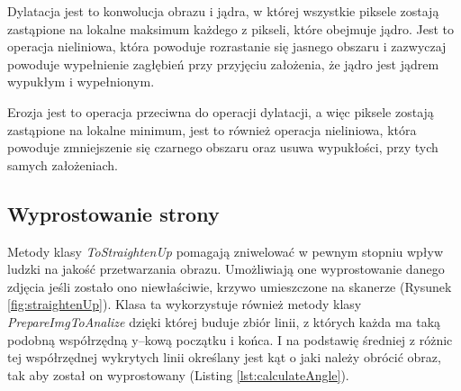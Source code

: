 \documentclass[a4paper,12pt]{article}
\newcommand\spacingIndent{2.2em}
\begin{document}
		        Dylatacja jest to konwolucja obrazu i jądra, w której wszystkie piksele zostają zastąpione na lokalne maksimum każdego z pikseli, które obejmuje jądro. Jest to operacja nieliniowa, która powoduje rozrastanie się jasnego obszaru i zazwyczaj powoduje wypełnienie zagłębień przy przyjęciu założenia, że jądro jest jądrem wypukłym i wypełnionym. 
		        
    		    Erozja jest to operacja przeciwna do operacji dylatacji, a więc piksele zostają zastąpione na lokalne minimum, jest to również operacja nieliniowa, która powoduje zmniejszenie się czarnego obszaru oraz usuwa wypukłości, przy tych samych założeniach.
		    
		\subsection{Wyprostowanie strony}		
		    \hspace{\spacingIndent} 
		    Metody klasy \textit{ToStraightenUp} pomagają zniwelować w pewnym stopniu wpływ      ludzki na jakość przetwarzania obrazu. Umożliwiają one wyprostowanie        danego zdjęcia jeśli zostało ono niewłaściwie, krzywo umieszczone na      skanerze (Rysunek \ref{fig:straightenUp}). Klasa ta wykorzystuje również metody klasy \textit{PrepareImgToAnalize}     dzięki której buduje zbiór linii, z których każda ma taką podobną           współrzędną y--kową początku i końca. I na podstawię średniej z różnic     tej współrzędnej wykrytych linii określany jest kąt o jaki należy        obrócić obraz, tak aby został on wyprostowany (Listing \ref{lst:calculateAngle}).  
		
\end{document}
